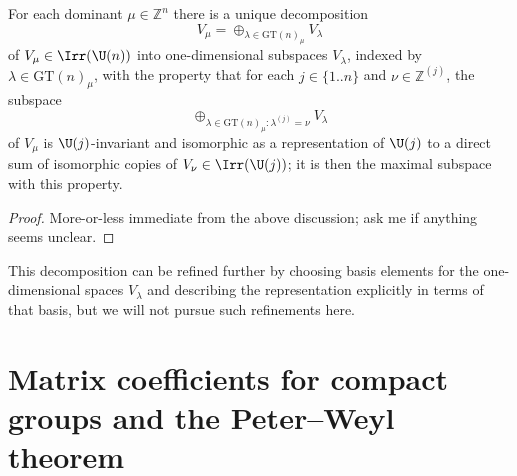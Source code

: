 \documentclass[reqno]{amsart} 
\begin{document}
\begin{theorem}
  For each dominant $\mu \in \mathbb{Z}^n$ there is a unique decomposition
  \begin{equation*}
    V_\mu = \oplus_{\lambda \in \mathrm{GT}(n)_\mu} V_\lambda
  \end{equation*}
  of $V_\mu \in \Irr(\U(n))$ into one-dimensional subspaces $V_\lambda$, indexed by $\lambda \in \mathrm{GT}(n)_\mu$, with the property that for each $j \in \{1..n\}$ and $\nu \in \mathbb{Z}^{(j)}$, the subspace
  \begin{equation*}
    \oplus_{\lambda \in \mathrm{GT}(n)_\mu : \lambda^{(j)} = \nu} V_\lambda
  \end{equation*}
  of $V_\mu$ is $\U(j)$-invariant and isomorphic as a representation of $\U(j)$ to a direct sum of isomorphic copies of $V_\nu \in \Irr(\U(j))$; it is then the maximal subspace with this property.
\end{theorem}
\begin{proof}
  More-or-less immediate from the above discussion; ask me if anything seems unclear.
\end{proof}
This decomposition can be refined further by choosing basis elements for the one-dimensional spaces $V_\lambda$ and describing the representation explicitly in terms of that basis, but we will not pursue such refinements here.


\newpage


\section{Matrix coefficients for compact groups and the Peter--Weyl theorem}\label{sec:cnh2voocm2}
\end{document}
